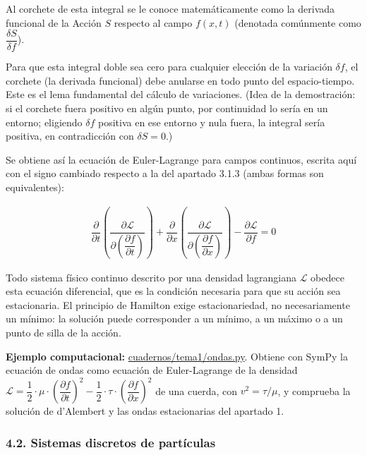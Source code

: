 \documentclass[
  spanish,
]{article}
\begin{document}
Al corchete de esta integral se le conoce matemáticamente como la
derivada funcional de la Acción \(S\) respecto al campo \(f(x,t)\)
(denotada comúnmente como \(\dfrac{\delta S}{\delta f}\)).

Para que esta integral doble sea cero para cualquier elección de la
variación \(\delta f\), el corchete (la derivada funcional) debe
anularse en todo punto del espacio-tiempo. Este es el lema fundamental
del cálculo de variaciones. (Idea de la demostración: si el corchete
fuera positivo en algún punto, por continuidad lo sería en un entorno;
eligiendo \(\delta f\) positiva en ese entorno y nula fuera, la integral
sería positiva, en contradicción con \(\delta S = 0\).)

Se obtiene así la ecuación de Euler-Lagrange para campos continuos,
escrita aquí con el signo cambiado respecto a la del apartado 3.1.3
(ambas formas son equivalentes):

\[
\begin{aligned}
\dfrac{\partial}{\partial t}\left( \dfrac{\partial \mathcal{L}}{\partial \left(\dfrac{\partial f}{\partial t}\right)} \right) + \dfrac{\partial}{\partial x}\left( \dfrac{\partial \mathcal{L}}{\partial \left(\dfrac{\partial f}{\partial x}\right)} \right) - \dfrac{\partial \mathcal{L}}{\partial f} = 0
\end{aligned}
\]

Todo sistema físico continuo descrito por una densidad lagrangiana
\(\mathcal{L}\) obedece esta ecuación diferencial, que es la condición
necesaria para que su acción sea estacionaria. El principio de Hamilton
exige estacionariedad, no necesariamente un mínimo: la solución puede
corresponder a un mínimo, a un máximo o a un punto de silla de la
acción.

\textbf{Ejemplo computacional:}
\href{https://github.com/julian1c2a/MCC/blob/main/cuadernos/tema1/ondas.py}{cuadernos/tema1/ondas.py}.
Obtiene con SymPy la ecuación de ondas como ecuación de Euler-Lagrange
de la densidad
\(\mathcal{L} = \dfrac{1}{2} \cdot \mu \cdot \left(\dfrac{\partial f}{\partial t}\right)^2 - \dfrac{1}{2} \cdot \tau \cdot \left(\dfrac{\partial f}{\partial x}\right)^2\)
de una cuerda, con \(v^2 = \tau/\mu\), y comprueba la solución de
d'Alembert y las ondas estacionarias del apartado 1.

\subsubsection{4.2. Sistemas discretos de
partículas}\label{sistemas-discretos-de-partuxedculas}
\end{document}
